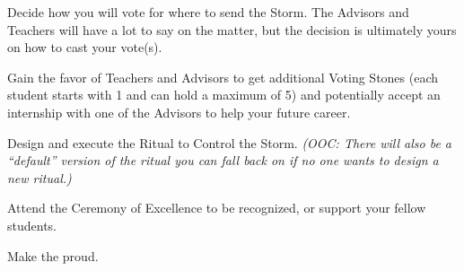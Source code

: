 \documentclass[blue]{GL2020}
\begin{document}
\begin{itemz}[Goals]
    \item Decide how you will vote for where to send the Storm. The Advisors and Teachers will have a lot to say on the matter, but the decision is ultimately yours on how to cast your vote(s).
     \item Gain the favor of Teachers and Advisors to get additional Voting Stones (each student starts with 1 and can hold a maximum of 5) and potentially accept an internship with one of the Advisors to help your future career.
    \item Design and execute the Ritual to Control the Storm. \emph{(OOC: There will also be a “default” version of the ritual you can fall back on if no one wants to design a new ritual.)}
    \item Attend the Ceremony of Excellence to be recognized, or support your fellow students.
    \item Make the \pSc{} proud.
\end{itemz}
\end{document}
